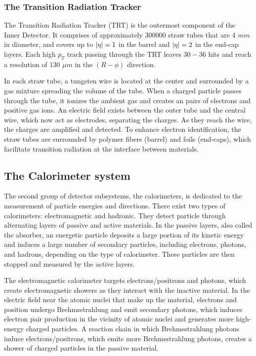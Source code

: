 
\subsubsection{The Transition Radiation Tracker}
The Transition Radiation Tracker (TRT) is the outermost component of the Inner Detector. It comprises of approximately 300000 straw tubes that are 4 $mm$ in diameter, and covers up to $\abs{\eta}=1$ in the barrel and $\abs{\eta} =2$ in the end-cap layers. Each high $p_T$ track passing through the TRT leaves $30-36$ hits and reach a resolution of 130 $\mu m$ in the $(R-\phi)$ direction. 

In each straw tube, a tungsten wire is located at the center and surrounded by a gas mixture spreading the volume of the tube. When a charged particle passes through the tube, it ionizes the ambient gas and creates an pairs of electrons and positive gas ions. An electric field exists between the outer tube and the central wire, which now act as electrodes, separating the charges. As they reach the wire, the charges are amplified and detected. To enhance electron identification, the straw tubes are surrounded by polymer fibers (barrel) and foils (end-caps), which facilitate transition radiation at the interface between materials. 

\subsection{The Calorimeter system}

The second group of detector subsystems, the calorimeters, is dedicated to the measurement of particle energies and directions. There exist two types of calorimeters: electromagnetic and hadronic. 
They detect particle through alternating layers of passive and active materials. 
In the passive layers, also called the absorber, an energetic particle deposits a large portion of its kinetic energy and induces a large number of secondary particles, including electrons, photons, and hadrons, depending on the type of calorimeter. 
These particles are then stopped and measured by the active layers. 

The electromagnetic calorimeter targets electrons/positrons and photons, which create electromagnetic showers as they interact with the inactive material. In the electric field near the atomic nuclei that make up the material, electrons and position undergo Brehmsstrahlung and emit secondary photons, which induces electron pair production in the vicinity of atomic nuclei and generates more high-energy charged particles. 
A reaction chain in which Brehmsstrahlung photons induce electrons/positrons, which emits more Brehmsstrahlung photons, creates a shower of charged particles in the passive material. 

